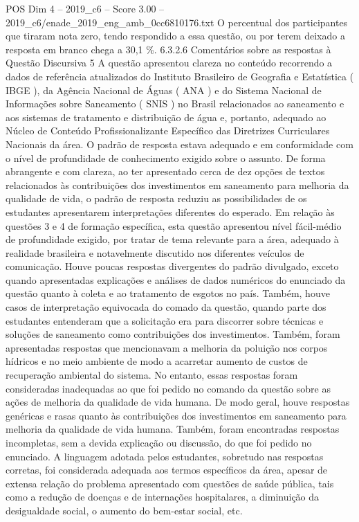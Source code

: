 \begin{textsample}{POS Dim 4 – 2019\_c6 – Score 3.00 – 2019\_c6/enade\_2019\_eng\_amb\_0cc6810176.txt}
O percentual dos participantes que tiraram nota zero, tendo respondido a essa questão, ou por terem deixado a resposta em branco chega a 30,1 \%. 6.3.2.6 Comentários sobre as respostas à Questão Discursiva 5 A questão apresentou clareza no conteúdo recorrendo a dados de referência atualizados do Instituto Brasileiro de Geografia e Estatística ( IBGE ), da Agência Nacional de Águas ( ANA ) e do Sistema Nacional de Informações sobre Saneamento ( SNIS ) no Brasil relacionados ao saneamento e aos sistemas de tratamento e distribuição de água e, portanto, adequado ao Núcleo de Conteúdo Profissionalizante Específico das Diretrizes Curriculares Nacionais da área.
O padrão de resposta estava adequado e em conformidade com o nível de profundidade de conhecimento exigido sobre o assunto.
De forma abrangente e com clareza, ao ter apresentado cerca de dez opções de textos relacionados às contribuições dos investimentos em saneamento para melhoria da qualidade de vida, o padrão de resposta reduziu as possibilidades de os estudantes apresentarem interpretações diferentes do esperado.
Em relação às questões 3 e 4 de formação específica, esta questão apresentou nível fácil-médio de profundidade exigido, por tratar de tema relevante para a área, adequado à realidade brasileira e notavelmente discutido nos diferentes veículos de comunicação.
Houve poucas respostas divergentes do padrão divulgado, exceto quando apresentadas explicações e análises de dados numéricos do enunciado da questão quanto à coleta e ao tratamento de esgotos no país.
Também, houve casos de interpretação equivocada do comado da questão, quando parte dos estudantes entenderam que a solicitação era para discorrer sobre técnicas e soluções de saneamento como contribuições dos investimentos.
Também, foram apresentadas respostas que mencionavam a melhoria da poluição nos corpos hídricos e no meio ambiente de modo a acarretar aumento de custos de recuperação ambiental do sistema.
No entanto, essas respostas foram consideradas inadequadas ao que foi pedido no comando da questão sobre as ações de melhoria da qualidade de vida humana.
De modo geral, houve respostas genéricas e rasas quanto às contribuições dos investimentos em saneamento para melhoria da qualidade de vida humana.
Também, foram encontradas respostas incompletas, sem a devida explicação ou discussão, do que foi pedido no enunciado.
A linguagem adotada pelos estudantes, sobretudo nas respostas corretas, foi considerada adequada aos termos específicos da área, apesar de extensa relação do problema apresentado com questões de saúde pública, tais como a redução de doenças e de internações hospitalares, a diminuição da desigualdade social, o aumento do bem-estar social, etc.

\end{textsample}
